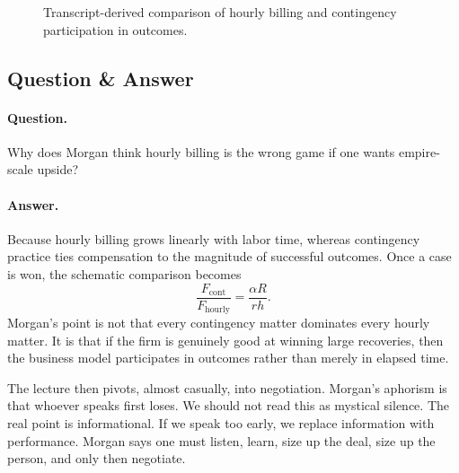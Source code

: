 \begin{figure}
\centering
{}
\caption{Transcript-derived comparison of hourly billing and contingency participation in outcomes.}
\label{fig:fee-contrast}
\end{figure}

\subsection{Question \& Answer}

\paragraph{Question.} Why does Morgan think hourly billing is the wrong game if one wants empire-scale upside?

\paragraph{Answer.} Because hourly billing grows linearly with labor time, whereas contingency practice ties compensation to the magnitude of successful outcomes. Once a case is won, the schematic comparison becomes
\begin{equation}
\frac{F_{\mathrm{cont}}}{F_{\mathrm{hourly}}}
=
\frac{\alpha R}{r h}.
\end{equation}
Morgan's point is not that every contingency matter dominates every hourly matter. It is that if the firm is genuinely good at winning large recoveries, then the business model participates in outcomes rather than merely in elapsed time.

The lecture then pivots, almost casually, into negotiation. Morgan's aphorism is that whoever speaks first loses. We should not read this as mystical silence. The real point is informational. If we speak too early, we replace information with performance. Morgan says one must listen, learn, size up the deal, size up the person, and only then negotiate.

